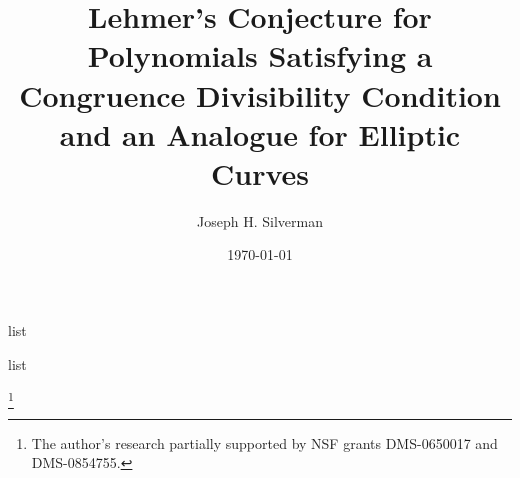 
\usepackage{amssymb,amscd,url}



\allowdisplaybreaks

\newif\ifdraft 
\drafttrue
\draftfalse


\newtheorem{theorem}{Theorem}
\newtheorem{lemma}[theorem]{Lemma}
\newtheorem{conjecture}[theorem]{Conjecture}
\newtheorem{proposition}[theorem]{Proposition}
\newtheorem{corollary}[theorem]{Corollary}
\newtheorem*{claim}{Claim}

\theoremstyle{definition}
\newtheorem{question}{Question}
 
\newtheorem*{definition}{Definition}
\newtheorem{example}[theorem]{Example}
\newtheorem{remark}[theorem]{Remark}

\theoremstyle{remark}
\newtheorem*{acknowledgement}{Acknowledgements}

\newenvironment{notation}[0]{  \begin{list}    {}    {\setlength{\itemindent}{0pt}
     \setlength{\labelwidth}{4\parindent}
     \setlength{\labelsep}{\parindent}
     \setlength{\leftmargin}{5\parindent}
     \setlength{\itemsep}{0pt}
     }   }  \end{list}

\newenvironment{parts}[0]{  \begin{list}{}    {\setlength{\itemindent}{0pt}
     \setlength{\labelwidth}{1.5\parindent}
     \setlength{\labelsep}{.5\parindent}
     \setlength{\leftmargin}{2\parindent}
     \setlength{\itemsep}{0pt}
     }   }  \end{list}

  
 
  

    


\title[{On Lehmer's Conjecture for Polynomials and
  for Elliptic Curves}]{Lehmer's Conjecture for Polynomials Satisfying a
  Congruence Divisibility Condition and an Analogue for Elliptic
  Curves}
\date{\today\ifdraft(\ Draft {3})\fi}

\author[Joseph H. Silverman]{Joseph H. Silverman}
\address{Mathematics Department, Box 1917
         Brown University, Providence, RI 02912 USA}
\thanks{The author's research partially supported by NSF grants DMS-0650017 and
DMS-0854755.}

